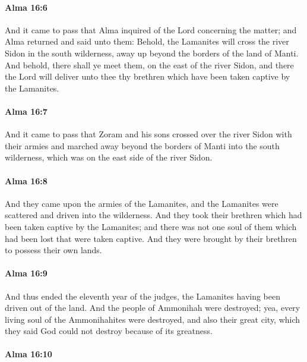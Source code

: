 		\paragraph{Alma 16:6} %
			\label{ALMA-16-6}

			And it came to pass that Alma inquired of the Lord concerning the matter;
			and Alma returned and said unto them:
			Behold, the Lamanites will cross the river Sidon in the south wilderness,
			away up beyond the borders of the land of Manti.
			And behold, there shall ye meet them, on the east of the river Sidon,
			and there the Lord will deliver unto thee thy brethren
			which have been taken captive by the Lamanites.

		\paragraph{Alma 16:7} %
			\label{ALMA-16-7}

			And it came to pass that
			Zoram and his sons crossed over the river Sidon with their armies
			and marched away beyond the borders of Manti into the south wilderness,
			which was on the east side of the river Sidon.

		\paragraph{Alma 16:8} %
			\label{ALMA-16-8}

			And they came upon the armies of the Lamanites,
			and the Lamanites were scattered and driven into the wilderness.
			And they took their brethren which had been taken captive by the Lamanites;
			and there was not one soul of them which had been lost that were taken captive.
			And they were brought by their brethren to possess their own lands.

		\paragraph{Alma 16:9} %
			\label{ALMA-16-9}

			And thus ended the eleventh year of the judges,
			the Lamanites having been driven out of the land.
			And the people of Ammonihah were destroyed;
			yea, every living soul of the Ammonihahites were destroyed,
			and also their great city,
			which they said God could not destroy because of its greatness.

		\paragraph{Alma 16:10} %
			\label{ALMA-16-10}

